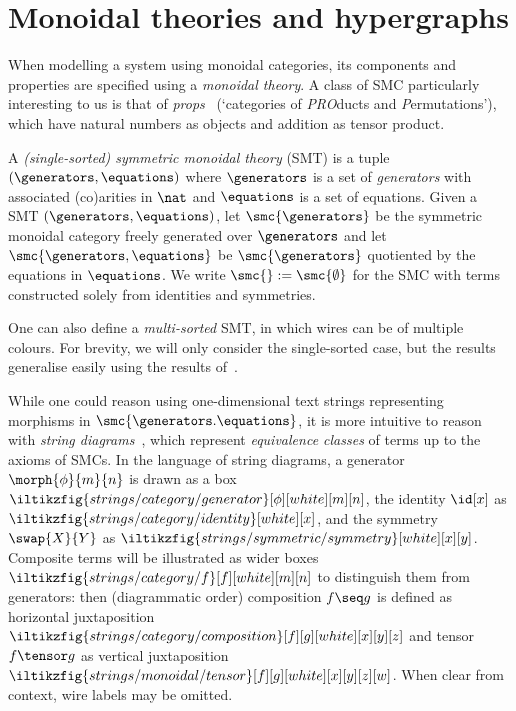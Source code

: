\section{Monoidal theories and hypergraphs}

When modelling a system using monoidal categories, its components and
properties are specified using a \emph{monoidal theory}.
A class of SMC particularly interesting to us is that of
\emph{props}~\cite{maclane1965categorical} (`categories of \emph{PRO}ducts and
\emph{P}ermutations'), which have natural numbers as objects and addition as
tensor product.

\begin{definition}
    A \emph{(single-sorted) symmetric monoidal theory} (SMT) is a tuple \(
        (\generators,\equations)
    \) where \(\generators\) is a set of \emph{generators} with associated
    (co)arities in \(\nat\) and \(\equations\) is a set of equations.
    Given a SMT \((\generators,\equations)\), let \(
        \smc{\generators}
    \) be the symmetric monoidal category freely generated over \(\generators\)
    and let \(
        \smc{\generators,\equations}
    \) be \(\smc{\generators}\) quotiented by the equations in \(\equations\).
    We write \(\smc{} := \smc{\emptyset}\) for the SMC with terms constructed
    solely from identities and symmetries.
\end{definition}

\begin{remark}
    One can also define a \emph{multi-sorted} SMT, in which wires can be of
    multiple colours.
    For brevity, we will only consider the single-sorted case, but the results
    generalise easily using the results
    of~\cite{bonchi2022string,bonchi2022string}.
\end{remark}

While one could reason using one-dimensional text strings representing morphisms
in \(\smc{\generators.\equations}\), it is more intuitive to reason with
\emph{string diagrams}~\cite{joyal1991geometry,selinger2011survey}, which
represent \emph{equivalence classes} of terms up to the axioms of SMCs.
In the language of string diagrams, a generator \(\morph{\phi}{m}{n}\) is drawn
as a box \(
    \iltikzfig{strings/category/generator}[\phi][white][m][n]
\), the identity \(\id[x]\) as \(
    \iltikzfig{strings/category/identity}[white][x]
\), and the symmetry \(\swap{X}{Y}\) as \(
    \iltikzfig{strings/symmetric/symmetry}[white][x][y]
\).
Composite terms will be illustrated as wider boxes \(
    \iltikzfig{strings/category/f}[f][white][m][n]
\) to distinguish them from generators: then (diagrammatic order) composition
\(f \seq g\) is defined as horizontal juxtaposition \(
    \iltikzfig{strings/category/composition}[f][g][white][x][y][z]
\) and tensor \(f \tensor g\) as vertical juxtaposition \(
    \iltikzfig{strings/monoidal/tensor}[f][g][white][x][y][z][w]
\).
When clear from context, wire labels may be omitted.

